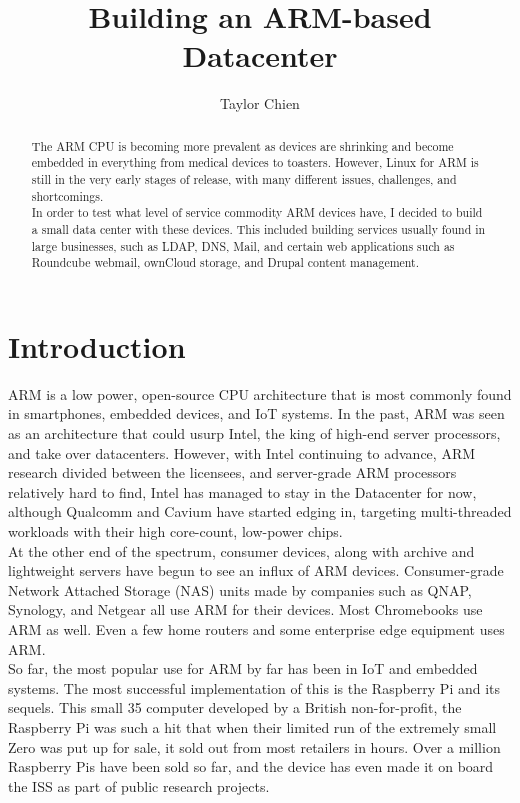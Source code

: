 \documentclass[12pt]{spieman}  %
\title{Building an ARM-based Datacenter}
\author[a]{Taylor Chien}
\affil[a]{SUNY Polytechnic Institute, Computer Science Department, 100 Horatio Street, Utica, NY, 13502}
\begin{document}
 
\maketitle

\begin{abstract}
The ARM CPU is becoming more prevalent as devices are shrinking and become embedded in everything from medical devices to toasters. However, Linux for ARM is still in the very early stages of release, with many different issues, challenges, and shortcomings.\\

In order to test what level of service commodity ARM devices have, I decided to build a small data center with these devices. This included building services usually found in large businesses, such as LDAP, DNS, Mail, and certain web applications such as Roundcube webmail, ownCloud storage, and Drupal content management.
\end{abstract}

\section{Introduction}
\label{sec:intro}
ARM is a low power, open-source CPU architecture that is most commonly found in smartphones, embedded devices, and IoT systems. In the past, ARM was seen as an architecture that could usurp Intel, the king of high-end server processors, and take over datacenters. However, with Intel continuing to advance, ARM research divided between the licensees, and server-grade ARM processors relatively hard to find, Intel has managed to stay in the Datacenter for now, although Qualcomm and Cavium have started edging in, targeting multi-threaded workloads with their high core-count, low-power chips.\\

At the other end of the spectrum, consumer devices, along with archive and lightweight servers have begun to see an influx of ARM devices. Consumer-grade Network Attached Storage (NAS) units made by companies such as QNAP, Synology, and Netgear all use ARM for their devices. Most Chromebooks use ARM as well. Even a few home routers and some enterprise edge equipment uses ARM.\\

So far, the most popular use for ARM by far has been in IoT and embedded systems. The most successful implementation of this is the Raspberry Pi and its sequels. This small 35 computer developed by a British non-for-profit, the Raspberry Pi was such a hit that when their limited run of the extremely small Zero was put up for sale, it sold out from most retailers in hours. Over a million Raspberry Pis have been sold so far, and the device has even made it on board the ISS as part of public research projects.\\
\end{document}
